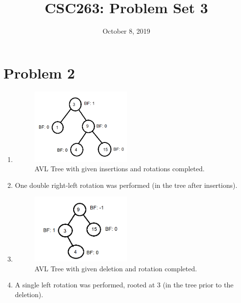 \documentclass{article}
\title{CSC263: Problem Set 3}
\date{October 8, 2019}
\begin{document}
\maketitle

\section{Problem 2}

\begin{enumerate}[label=(\alph*)]


\item \begin{figure}[htp]
    \centering
    \includegraphics[width=5cm]{2a.png}
    \caption{AVL Tree with given insertions and rotations completed.}
    \label{fig:tree}
    \end{figure}

\item One double right-left rotation was performed (in the tree after insertions).  


\item \begin{figure}[htp]
    \centering
    \includegraphics[width=5cm]{2C.png}
    \caption{AVL Tree with given deletion and rotation completed.}
    \label{fig:tree}
    \end{figure}

\item A single left rotation was performed, rooted at 3 (in the tree prior to the deletion).
\end{enumerate}
\end{document}
